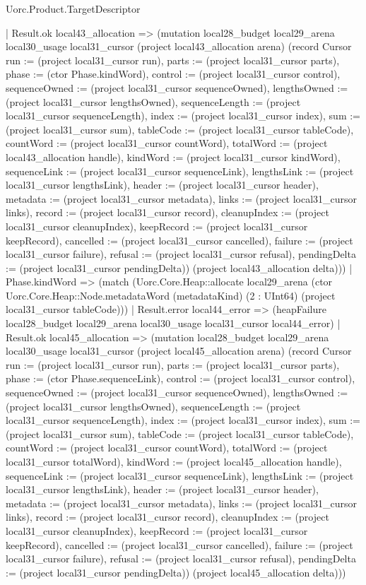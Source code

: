 \begin{lexlean}{Uorc.Product.TargetDescriptor}
\begin{semanticmodule}
{      | Result.ok local43_allocation => (mutation local28_budget local29_arena local30_usage local31_cursor (project local43_allocation arena) (record Cursor {run := (project local31_cursor run), parts := (project local31_cursor parts), phase := (ctor Phase.kindWord), control := (project local31_cursor control), sequenceOwned := (project local31_cursor sequenceOwned), lengthsOwned := (project local31_cursor lengthsOwned), sequenceLength := (project local31_cursor sequenceLength), index := (project local31_cursor index), sum := (project local31_cursor sum), tableCode := (project local31_cursor tableCode), countWord := (project local31_cursor countWord), totalWord := (project local43_allocation handle), kindWord := (project local31_cursor kindWord), sequenceLink := (project local31_cursor sequenceLink), lengthsLink := (project local31_cursor lengthsLink), header := (project local31_cursor header), metadata := (project local31_cursor metadata), links := (project local31_cursor links), record := (project local31_cursor record), cleanupIndex := (project local31_cursor cleanupIndex), keepRecord := (project local31_cursor keepRecord), cancelled := (project local31_cursor cancelled), failure := (project local31_cursor failure), refusal := (project local31_cursor refusal), pendingDelta := (project local31_cursor pendingDelta)}) (project local43_allocation delta)))
    | Phase.kindWord => (match (Uorc.Core.Heap::allocate local29_arena (ctor Uorc.Core.Heap::Node.metadataWord (metadataKind) (2 : UInt64) (project local31_cursor tableCode)))
      | Result.error local44_error => (heapFailure local28_budget local29_arena local30_usage local31_cursor local44_error)
      | Result.ok local45_allocation => (mutation local28_budget local29_arena local30_usage local31_cursor (project local45_allocation arena) (record Cursor {run := (project local31_cursor run), parts := (project local31_cursor parts), phase := (ctor Phase.sequenceLink), control := (project local31_cursor control), sequenceOwned := (project local31_cursor sequenceOwned), lengthsOwned := (project local31_cursor lengthsOwned), sequenceLength := (project local31_cursor sequenceLength), index := (project local31_cursor index), sum := (project local31_cursor sum), tableCode := (project local31_cursor tableCode), countWord := (project local31_cursor countWord), totalWord := (project local31_cursor totalWord), kindWord := (project local45_allocation handle), sequenceLink := (project local31_cursor sequenceLink), lengthsLink := (project local31_cursor lengthsLink), header := (project local31_cursor header), metadata := (project local31_cursor metadata), links := (project local31_cursor links), record := (project local31_cursor record), cleanupIndex := (project local31_cursor cleanupIndex), keepRecord := (project local31_cursor keepRecord), cancelled := (project local31_cursor cancelled), failure := (project local31_cursor failure), refusal := (project local31_cursor refusal), pendingDelta := (project local31_cursor pendingDelta)}) (project local45_allocation delta)))
}
\end{semanticmodule}
\end{lexlean}
